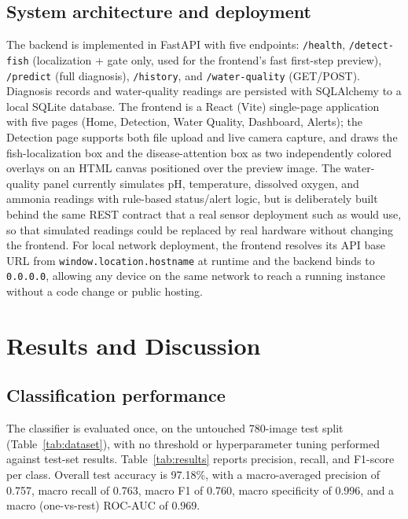 \documentclass[conference]{IEEEtran}
\begin{document}
\subsection{System architecture and deployment}
The backend is implemented in FastAPI with five endpoints: \texttt{/health}, \texttt{/detect-fish} (localization + gate only, used for the frontend's fast first-step preview), \texttt{/predict} (full diagnosis), \texttt{/history}, and \texttt{/water-quality} (GET/POST). Diagnosis records and water-quality readings are persisted with SQLAlchemy to a local SQLite database. The frontend is a React (Vite) single-page application with five pages (Home, Detection, Water Quality, Dashboard, Alerts); the Detection page supports both file upload and live camera capture, and draws the fish-localization box and the disease-attention box as two independently colored overlays on an HTML canvas positioned over the preview image. The water-quality panel currently simulates pH, temperature, dissolved oxygen, and ammonia readings with rule-based status/alert logic, but is deliberately built behind the same REST contract that a real sensor deployment such as \cite{mohdjais2024} would use, so that simulated readings could be replaced by real hardware without changing the frontend. For local network deployment, the frontend resolves its API base URL from \texttt{window.location.hostname} at runtime and the backend binds to \texttt{0.0.0.0}, allowing any device on the same network to reach a running instance without a code change or public hosting.

\section{Results and Discussion}

\subsection{Classification performance}
The classifier is evaluated once, on the untouched 780-image test split (Table~\ref{tab:dataset}), with no threshold or hyperparameter tuning performed against test-set results. Table~\ref{tab:results} reports precision, recall, and F1-score per class. Overall test accuracy is 97.18\%, with a macro-averaged precision of 0.757, macro recall of 0.763, macro F1 of 0.760, macro specificity of 0.996, and a macro (one-vs-rest) ROC-AUC of 0.969.
\end{document}
